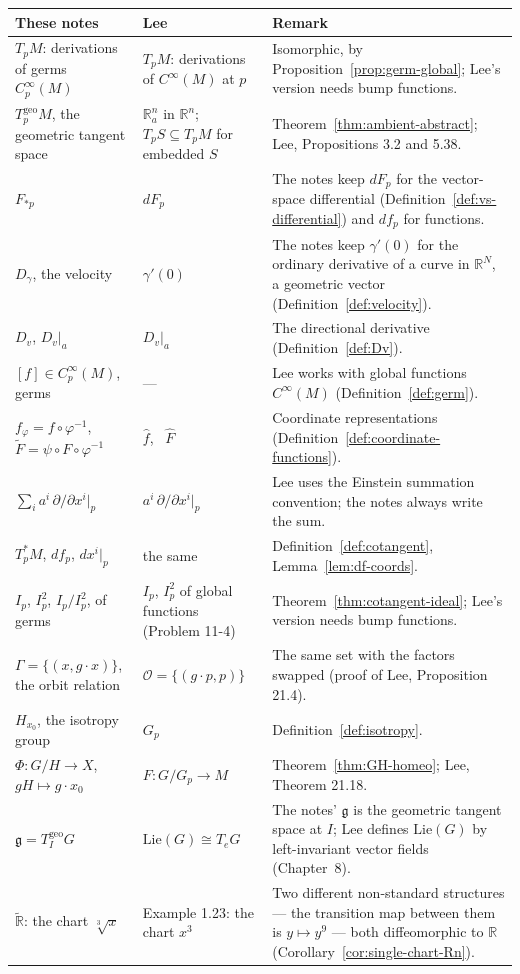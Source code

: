 \documentclass[11pt]{report}
\newcommand{\geo}{\mathrm{geo}}
\begin{document}
\begin{longtable}{>{\raggedright\arraybackslash}p{4.3cm} >{\raggedright\arraybackslash}p{4.3cm} >{\raggedright\arraybackslash}p{6.2cm}}
\toprule
\textbf{These notes} & \textbf{Lee} & \textbf{Remark} \\ \midrule \endhead
$T_pM$: derivations of germs $C_p^\infty(M)$ & $T_pM$: derivations of $C^\infty(M)$ at $p$ & Isomorphic, by Proposition~\ref{prop:germ-global}; Lee's version needs bump functions. \\
$T^{\geo}_pM$, the geometric tangent space & $\mathbb{R}^n_a$ in $\mathbb{R}^n$; $T_pS \subseteq T_pM$ for embedded $S$ & Theorem~\ref{thm:ambient-abstract}; Lee, Propositions 3.2 and 5.38. \\
$F_{*p}$ & $dF_p$ & The notes keep $dF_p$ for the vector-space differential (Definition~\ref{def:vs-differential}) and $df_p$ for functions. \\
$D_\gamma$, the velocity & $\gamma'(0)$ & The notes keep $\gamma'(0)$ for the ordinary derivative of a curve in $\mathbb{R}^N$, a geometric vector (Definition~\ref{def:velocity}). \\
$D_v$, $D_v|_a$ & $D_v|_a$ & The directional derivative (Definition~\ref{def:Dv}). \\
$[f] \in C_p^\infty(M)$, germs & --- & Lee works with global functions $C^\infty(M)$ (Definition~\ref{def:germ}). \\
$f_\varphi = f \circ \varphi^{-1}$, \ $\tilde F = \psi \circ F \circ \varphi^{-1}$ & $\hat f$, \ $\widehat F$ & Coordinate representations (Definition~\ref{def:coordinate-functions}). \\
$\sum_i a^i\, \partial/\partial x^i|_p$ & $a^i\, \partial/\partial x^i|_p$ & Lee uses the Einstein summation convention; the notes always write the sum. \\
$T_p^*M$, $df_p$, $dx^i|_p$ & the same & Definition~\ref{def:cotangent}, Lemma~\ref{lem:df-coords}. \\
$I_p$, $I_p^2$, $I_p/I_p^2$, of germs & $I_p$, $I_p^2$ of global functions (Problem 11-4) & Theorem~\ref{thm:cotangent-ideal}; Lee's version needs bump functions. \\
$\Gamma = \{(x, g \cdot x)\}$, the orbit relation & $\mathcal{O} = \{(g \cdot p, p)\}$ & The same set with the factors swapped (proof of Lee, Proposition 21.4). \\
$H_{x_0}$, the isotropy group & $G_p$ & Definition~\ref{def:isotropy}. \\
$\Phi : G/H \to X$, $gH \mapsto g \cdot x_0$ & $F : G/G_p \to M$ & Theorem~\ref{thm:GH-homeo}; Lee, Theorem 21.18. \\
$\mathfrak{g} = T^{\geo}_I G$ & $\mathrm{Lie}(G) \cong T_eG$ & The notes' $\mathfrak{g}$ is the geometric tangent space at $I$; Lee defines $\mathrm{Lie}(G)$ by left-invariant vector fields (Chapter~8). \\
$\widetilde{\mathbb{R}}$: the chart $\sqrt[3]{x}$ & Example 1.23: the chart $x^3$ & Two different non-standard structures --- the transition map between them is $y \mapsto y^9$ --- both diffeomorphic to $\mathbb{R}$ (Corollary~\ref{cor:single-chart-Rn}). \\
\bottomrule
\end{longtable}
\end{document}
